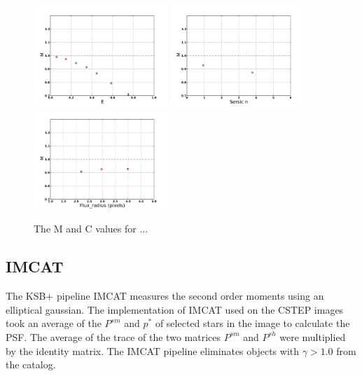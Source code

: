 \begin{figure}
\centering
\includegraphics[width=0.45\textwidth]{fig/MvaleDE.pdf} 
\includegraphics[width=0.45\textwidth]{fig/Mval_typeDE.pdf} 
\includegraphics[width=0.45\textwidth]{fig/Mval_sizeDE.pdf} 
\caption{The M and C values for ...}
\label{fig:DEIMOS_m}
\end{figure}

\newpage 
\subsection{IMCAT}
The KSB+ pipeline IMCAT measures the second order moments using an
elliptical gaussian. The implementation of IMCAT used on the CSTEP images
took an average of the $P^{sm}$ and $p^*$ of selected stars in the
image to calculate the PSF. The average of the trace of the two
matrices $P^{sm}$ and $P^{sh}$ were multiplied by the identity
matrix. The IMCAT pipeline eliminates objects with $ \gamma > 1.0 $
from the catalog.  \\

